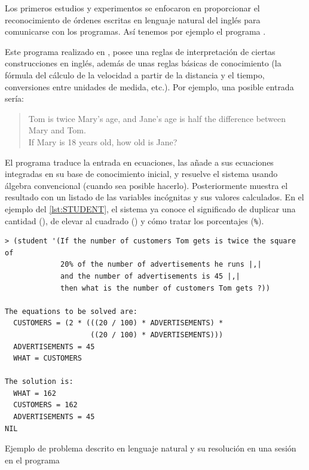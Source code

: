 Los primeros estudios y experimentos se enfocaron en proporcionar el reconocimiento de órdenes escritas en lenguaje natural del inglés para comunicarse con los programas. Así tenemos por ejemplo el programa  \citep{Bobrow1964}.

Este programa realizado en , posee una reglas de interpretación de ciertas construcciones en inglés, además de unas reglas básicas de conocimiento (la fórmula del cálculo de la velocidad a partir de la distancia y el tiempo, conversiones entre unidades de medida, etc.). Por ejemplo, una posible entrada sería:
\foreignblockquote{english}{Tom is twice Mary's age, and Jane's age is half the difference between \\
Mary and Tom.\\
If Mary is 18 years old, how old is Jane?}

El programa traduce la entrada en ecuaciones, las añade a sus ecuaciones integradas en su base de conocimiento inicial, y resuelve el sistema usando álgebra convencional (cuando sea posible hacerlo). Posteriormente muestra el resultado con un listado de las variables incógnitas y sus valores calculados. En el ejemplo del \autoref{lst:STUDENT}, el sistema ya conoce el significado de duplicar una cantidad (), de elevar al cuadrado () y cómo tratar los porcentajes (\verb=%=).

\begin{listing}[htbp]
\begin{verbatim}
> (student '(If the number of customers Tom gets is twice the square of
             20% of the number of advertisements he runs |,|
             and the number of advertisements is 45 |,|
             then what is the number of customers Tom gets ?))

The equations to be solved are:
  CUSTOMERS = (2 * (((20 / 100) * ADVERTISEMENTS) *
                    ((20 / 100) * ADVERTISEMENTS)))
  ADVERTISEMENTS = 45
  WHAT = CUSTOMERS

The solution is:
  WHAT = 162
  CUSTOMERS = 162
  ADVERTISEMENTS = 45
NIL
\end{verbatim}
\caption[Ejemplo de problema descrito en lenguaje natural y su resolución en una sesión en el programa ]{Ejemplo de problema descrito en lenguaje natural y su resolución en una sesión en el programa  \citep{Norvig2014}}
\label{lst:STUDENT}
\end{listing}

